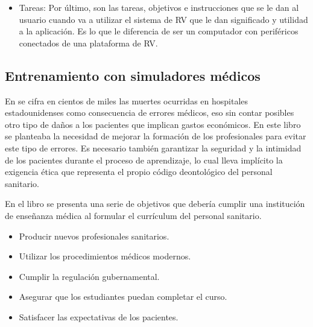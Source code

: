 \begin{itemize}
    \item Tareas: Por último, son las tareas, objetivos e instrucciones que se le dan al usuario cuando va a utilizar el sistema de \ac{RV} que le dan significado y utilidad a la aplicación. Es lo que le diferencia de ser un computador con periféricos conectados de una plataforma de \ac{RV}.
\end{itemize}



\subsection{Entrenamiento con simuladores médicos}




En \cite{donaldson2000err} se cifra en cientos de miles las muertes ocurridas en hospitales estadounidenses como consecuencia de errores médicos, eso sin contar posibles otro tipo de daños a los pacientes que implican gastos económicos. En este libro se planteaba la necesidad de mejorar la formación de los profesionales para evitar este tipo de errores. 
Es necesario también garantizar la seguridad y la intimidad de los pacientes durante el proceso de aprendizaje, lo cual lleva implícito la exigencia ética que representa el propio código deontológico del personal sanitario. 

En el libro \cite{dent2017practical} se presenta una serie de objetivos que debería cumplir una institución de enseñanza médica al formular el currículum del personal sanitario.
\begin{itemize}
    \item Producir nuevos profesionales sanitarios.
    \item Utilizar los procedimientos médicos modernos.
    \item Cumplir la regulación gubernamental.
    \item Asegurar que los estudiantes puedan completar el curso.
    \item Satisfacer las expectativas de los pacientes.
\end{itemize}


